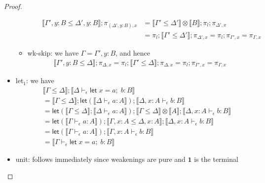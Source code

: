 \documentclass[acmsmall,screen,review]{acmart}
\newcommand{\mb}[1]{\ensuremath{\mathbf{#1}}}
\newcommand{\ms}[1]{\ensuremath{\mathsf{#1}}}
\newcommand{\letexpr}[3]{\ensuremath{\ms{let}\;#1 = #2;\;#3}}
\newcommand{\bhyp}[2]{#1 : #2}
\newcommand{\hasty}[4]{#1 \vdash_{#2} #3: {#4}}
\newcommand{\brle}[1]{{\textsf{#1}}}
\newcommand{\dnt}[1]{\llbracket{#1}\rrbracket}
\newcommand{\lmor}[1]{\ms{let}(#1)}
\begin{document}
\begin{proof}
\begin{itemize}
\begin{itemize}
\begin{itemize}
\begin{equation}
\begin{aligned}
          \dnt{\Gamma', \bhyp{y}{B} \leq \Delta', \bhyp{y}{B}} ; \pi_{(\Delta', \bhyp{y}{B}), x}
          & = \dnt{\Gamma' \leq \Delta'} \otimes \dnt{B} ; \pi_l ; \pi_{\Delta', x} \\
          & = \pi_l ; \dnt{\Gamma' \leq \Delta'} ; \pi_{\Delta', x}
          = \pi_l ; \pi_{\Gamma', x}
          = \pi_{\Gamma, x}
          \end{aligned}
        \end{equation}
      \end{itemize}
      \item \brle{wk-skip}: we have $\Gamma = \Gamma', \bhyp{y}{B}$, and hence
      \begin{equation}
        \begin{aligned}
          \dnt{\Gamma', \bhyp{y}{B} \leq \Delta} ; \pi_{\Delta, x}
          = \pi_l ; \dnt{\Gamma' \leq \Delta} ; \pi_{\Delta, x}
          = \pi_l ; \pi_{\Gamma', x}
          = \pi_{\Gamma, x}
        \end{aligned}
      \end{equation}
    \end{itemize}
    \item \brle{let$_1$}: we have
    \begin{equation}
      \begin{aligned}
        & \dnt{\Gamma \leq \Delta} ; \dnt{\hasty{\Delta}{\epsilon}{\letexpr{x}{a}{b}}{B}} \\
        & = \dnt{\Gamma \leq \Delta} 
          ; \lmor{\dnt{\hasty{\Delta}{\epsilon}{a}{A}}}
          ; \dnt{\hasty{\Delta, \bhyp{x}{A}}{\epsilon}{b}{B}} \\
        &= \lmor{\dnt{\Gamma \leq \Delta} ; \dnt{\hasty{\Delta}{\epsilon}{a}{A}}}
        ; \dnt{\Gamma \leq \Delta} \otimes \dnt{A}
        ; \dnt{\hasty{\Delta, \bhyp{x}{A}}{\epsilon}{b}{B}} \\
        &= \lmor{\dnt{\hasty{\Gamma}{\epsilon}{a}{A}}}
        ; \dnt{\Gamma, \bhyp{x}{A} \leq \Delta, \bhyp{x}{A}}
        ; \dnt{\hasty{\Delta, \bhyp{x}{A}}{\epsilon}{b}{B}} \\
        &= \lmor{\dnt{\hasty{\Gamma}{\epsilon}{a}{A}}}
        ; \dnt{\hasty{\Gamma, \bhyp{x}{A}}{\epsilon}{b}{B}} \\
        &= \dnt{\hasty{\Gamma}{\epsilon}{\letexpr{x}{a}{b}}{B}}
      \end{aligned}
    \end{equation}
    \item \brle{unit}: follows immediately since weakenings are pure and $\mb{1}$ is the terminal

\end{itemize}
\end{proof}
\end{document}
